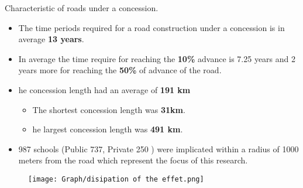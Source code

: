 \documentclass[9pt]{beamer}
\begin{document}
\appendix %
\begin{frame}{Characteristic of roads under a concession.}
\hyperlink{concession}{}   \label{concession_anexo}
\justifying 

\begin{itemize}
    \item The time periods required for a road construction under a concession is in average \textbf{13 years}.\\
    \item In average the time require for reaching the \textbf{10\%} advance is 7.25 years and 2 years more for reaching the \textbf{50\%} of advance of the road.
    \item he concession length had an average of \textbf{191 km}
    \begin{itemize}
        \item The shortest concession length was \textbf{31km}.
        \item he largest concession length was \textbf{491 km}.
    \end{itemize}
    \item 987  schools (Public 737, Private 250 ) were implicated within a radius of 1000 meters from the road which represent the focus of this research. 
\end{itemize}
             
             

  \begin{figure} [h!]
    \centering
    \renewcommand\thefigure{4.1}
     \texttt{[image: Graph/disipation of the effet.png]}
    \caption{} 
    \label{fig:Figdispertion}
\end{figure}


\end{frame}

\end{document}
